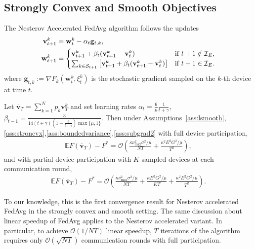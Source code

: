 \subsection{Strongly Convex and Smooth Objectives}
\begin{comment}
We first show that the Nesterov accelerated FedAvg has $\mathcal{O}(1/NT)$
convergence rate for $\mu$-strongly convex and $L$-smooth objectives.
\end{comment}
The Nesterov Accelerated FedAvg algorithm follows the updates
\begin{align*}
\mathbf{v}_{t+1}^{k} & =\mathbf{w}_{t}^{k}-\alpha_{t}\mathbf{g}_{t,k},\\
\mathbf{w}_{t+1}^{k} & =\begin{cases}
\mathbf{v}_{t+1}^{k}+\beta_{t}(\mathbf{v}_{t+1}^{k}-\mathbf{v}_{t}^{k}) & \text{if }t+1\notin\mathcal{I}_{E},\\
\sum_{k \in {\mathcal{S}}_{t+1}}\left[\mathbf{v}_{t+1}^{k}+\beta_{t}(\mathbf{v}_{t+1}^{k}-\mathbf{v}_{t}^{k})\right] & \text{if }t+1\in\mathcal{I}_{E}.
\end{cases}
\end{align*}
where $\mathbf{g}_{t,k}:=\nabla F_{k}(\mathbf{w}_{t}^{k},\xi_{t}^{k})$ is
the stochastic gradient sampled on the $k$-th device at time $t$.  
\begin{theorem}
	\label{thm:nesterov_scvx}Let $\overline{\mathbf{v}}_{T}=\sum_{k=1}^{N}p_{k}\mathbf{v}_{T}^{k}$
	and set learning rates $\alpha_{t}=\frac{6}{\mu}\frac{1}{t+\gamma}$,  $\beta_{t-1}=\frac{3}{14(t+\gamma)(1-\frac{6}{t+\gamma})\max\{\mu,1\}}$. Then under Assumptions~\ref{ass:lsmooth},\ref{ass:stroncvx},\ref{ass:boundedvariance},\ref{ass:subgrad2} with full device participation, 
	\begin{align*}
	\mathbb{E}F(\overline{\mathbf{v}}_{T})-F^{\ast}=\mathcal{O}\left(\frac{\kappa\nu_{\max}^{2}\sigma^{2}/\mu}{NT}+\frac{\kappa^{2}E^{2}G^{2}/\mu}{T^{2}}\right),
	\end{align*}
	and with partial device participation with $K$ sampled devices at
	each communication round, 
	\begin{align*}
	\mathbb{E}F(\overline{\mathbf{v}}_{T})-F^{\ast}=\mathcal{O}\left(\frac{\kappa\nu_{\max}^{2}\sigma^{2}/\mu}{NT}+\frac{\kappa E^{2}G^{2}/\mu}{KT}+\frac{\kappa^{2}E^{2}G^{2}/\mu}{T^{2}}\right).
	\end{align*}
\end{theorem}
%
To our knowledge, this is the first convergence result for Nesterov
accelerated FedAvg in the strongly convex and smooth setting. The
same discussion about linear speedup of FedAvg applies to the Nesterov
accelerated variant. In particular, to achieve $\mathcal{O}(1/NT)$
linear speedup, $T$ iterations of the algorithm requires only $\mathcal{O}(\sqrt{NT})$
communication rounds with full participation. 


